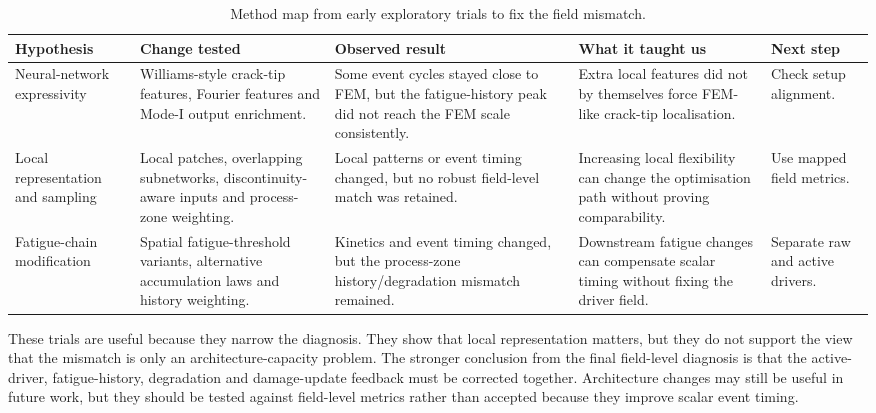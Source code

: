\begin{table}[!htb]
\centering
\caption{Method map from early exploratory trials to fix the field mismatch.}
\label{tab:c4_pre_alignment_diagnostic_map}
{\scriptsize
\setlength{\tabcolsep}{3pt}
\renewcommand{\arraystretch}{1.14}
\begin{tabular}{@{}>{\raggedright\arraybackslash}p{}
>{\raggedright\arraybackslash}p{}
>{\raggedright\arraybackslash}p{}
>{\raggedright\arraybackslash}p{}
>{\raggedright\arraybackslash}p{}@{}}
\hline
Hypothesis & Change tested & Observed result & What it taught us & Next step \\
\hline
Neural-network expressivity & Williams-style crack-tip features, Fourier features and Mode-I output enrichment. & Some event cycles stayed close to FEM, but the fatigue-history peak did not reach the FEM scale consistently. & Extra local features did not by themselves force FEM-like crack-tip localisation. & Check setup alignment. \\
Local representation and sampling & Local patches, overlapping subnetworks, discontinuity-aware inputs and process-zone weighting. & Local patterns or event timing changed, but no robust field-level match was retained. & Increasing local flexibility can change the optimisation path without proving comparability. & Use mapped field metrics. \\
Fatigue-chain modification & Spatial fatigue-threshold variants, alternative accumulation laws and history weighting. & Kinetics and event timing changed, but the process-zone history/degradation mismatch remained. & Downstream fatigue changes can compensate scalar timing without fixing the driver field. & Separate raw and active drivers. \\
\hline
\end{tabular}
}
\end{table}

These trials are useful because they narrow the diagnosis. They show that local representation matters, but they do not support the view that the mismatch is only an architecture-capacity problem. The stronger conclusion from the final field-level diagnosis is that the active-driver, fatigue-history, degradation and damage-update feedback must be corrected together. Architecture changes may still be useful in future work, but they should be tested against field-level metrics rather than accepted because they improve scalar event timing.



